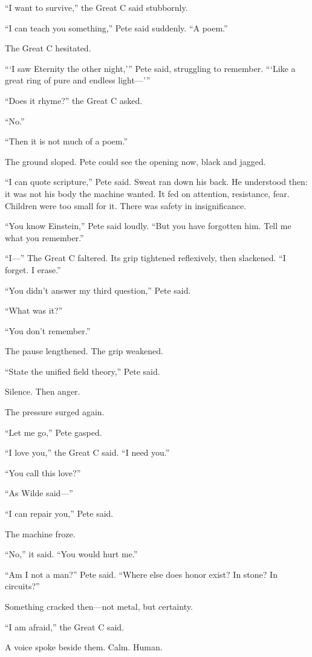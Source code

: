 “I want to survive,” the Great C said stubbornly.

“I can teach you something,” Pete said suddenly. “A poem.”

The Great C hesitated.

“‘I saw Eternity the other night,’” Pete said, struggling to remember. “‘Like a great ring of pure and endless light—’”

“Does it rhyme?” the Great C asked.

“No.”

“Then it is not much of a poem.”

The ground sloped. Pete could see the opening now, black and jagged.

“I can quote scripture,” Pete said. Sweat ran down his back. He understood then: it was not his body the machine wanted. It fed on attention, resistance, fear. Children were too small for it. There was safety in insignificance.

“You know Einstein,” Pete said loudly. “But you have forgotten him. Tell me what you remember.”

“I—” The Great C faltered. Its grip tightened reflexively, then slackened. “I forget. I erase.”

“You didn’t answer my third question,” Pete said.

“What was it?”

“You don’t remember.”

The pause lengthened. The grip weakened.

“State the unified field theory,” Pete said.

Silence. Then anger.

The pressure surged again.

“Let me go,” Pete gasped.

“I love you,” the Great C said. “I need you.”

“You call this love?”

“As Wilde said—”

“I can repair you,” Pete said.

The machine froze.

“No,” it said. “You would hurt me.”

“Am I not a man?” Pete said. “Where else does honor exist? In stone? In circuits?”

Something cracked then—not metal, but certainty.

“I am afraid,” the Great C said.

A voice spoke beside them. Calm. Human.

